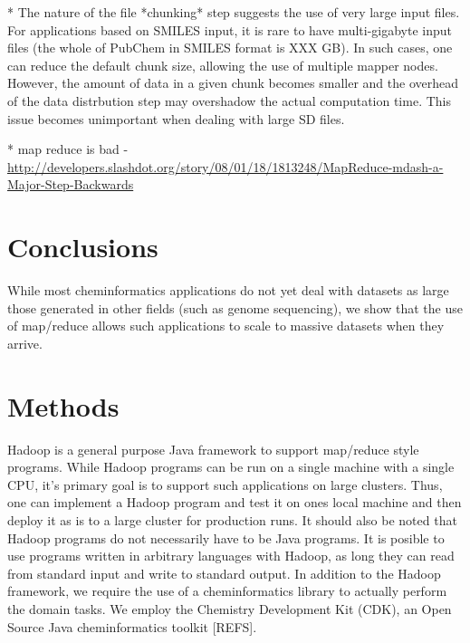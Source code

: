 \documentclass[10pt]{bmc_article}
\newenvironment{bmcformat}{\begin{raggedright}\baselineskip20pt\sloppy\setboolean{publ}{false}}{\end{raggedright}\baselineskip20pt\sloppy}
\begin{document}
\begin{bmcformat}
* The nature of the file *chunking* step suggests the use of very
large input files. For applications based on SMILES input, it is rare
to have multi-gigabyte input files (the whole of PubChem in SMILES
format is XXX GB). In such cases, one can reduce the default chunk
size, allowing the use of multiple mapper nodes. However, the amount
of data in a given chunk becomes smaller and the overhead of the data
distrbution step may overshadow the actual computation time. This
issue becomes unimportant when dealing with large SD files.

* map reduce is bad -
\url{http://developers.slashdot.org/story/08/01/18/1813248/MapReduce-mdash-a-Major-Step-Backwards}


    

\section*{Conclusions}
While most cheminformatics applications do not yet deal with datasets
as large those generated in other fields (such as genome sequencing),
we show that the use of map/reduce allows such applications to scale
to massive datasets when they arrive.


  
\section*{Methods}
Hadoop is a general purpose Java framework to support map/reduce style
programs. While Hadoop programs can be run on a single machine with a
single CPU, it's primary goal is to support such applications on large
clusters. Thus, one can implement a Hadoop program and test it on ones
local machine and then deploy it as is to a large cluster for
production runs. It should also be noted that Hadoop programs do not
necessarily have to be Java programs. It is posible to use programs
written in arbitrary languages with Hadoop, as long they can read from
standard input and write to standard output. In addition to the Hadoop
framework, we require the use of a cheminformatics library to actually
perform the domain tasks. We employ the Chemistry Development Kit
(CDK), an Open Source Java cheminformatics toolkit [REFS].


\end{bmcformat}
\end{document}
